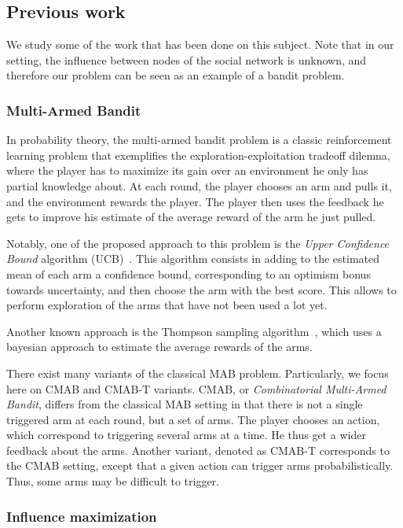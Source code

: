 \documentclass[a4paper,12pt]{article}
\begin{document}
\subsection{Previous work}

We study some of the work that has been done on this subject. Note that in our setting, the influence between nodes of the social network is unknown, and therefore our problem can be seen as an example of a bandit problem.

\subsubsection{Multi-Armed Bandit}

In probability theory, the multi-armed bandit problem is a classic reinforcement learning problem that exemplifies the exploration-exploitation tradeoff dilemna, where the player has to maximize its gain over an environment he only has partial knowledge about. At each round, the player chooses an arm and pulls it, and the environment rewards the player. The player then uses the feedback he gets to improve his estimate of the average reward of the arm he just pulled.

Notably, one of the proposed approach to this problem is the \emph{Upper Confidence Bound} algorithm (UCB)~\cite{li2010contextual}. This algorithm consists in adding to the estimated mean of each arm a confidence bound, corresponding to an optimism bonus towards uncertainty, and then choose the arm with the best score. This allows to perform exploration of the arms that have not been used a lot yet.

Another known approach is the Thompson sampling algorithm~\cite{thompson1933likelihood}, which uses a bayesian approach to estimate the average rewards of the arms.

There exist many variants of the classical MAB problem. Particularly, we focus here on CMAB and CMAB-T variants. CMAB, or \emph{Combinatorial Multi-Armed Bandit}, differs from the classical MAB setting in that there is not a single triggered arm at each round, but a set of arms. The player chooses an action, which correspond to triggering several arms at a time. He thus get a wider feedback about the arms. Another variant, denoted as CMAB-T corresponds to the CMAB setting, except that a given action can trigger arms probabilistically. Thus, some arms may be difficult to trigger.


\subsubsection{Influence maximization}
\end{document}

